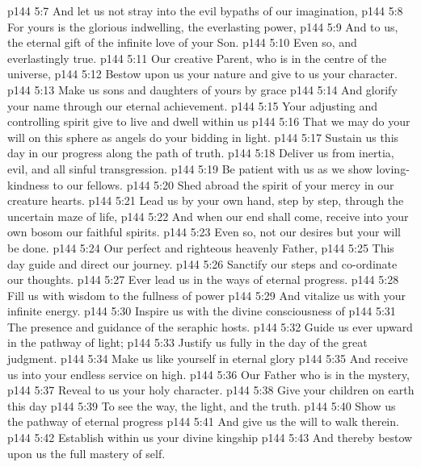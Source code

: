 \vs p144 5:7 \hsetoff And let us not stray into the evil bypaths of our imagination,
\vs p144 5:8 For yours is the glorious indwelling, the everlasting power,
\vs p144 5:9 \hsetoff And to us, the eternal gift of the infinite love of your Son.
\vs p144 5:10 Even so, and everlastingly true.
\separatorshort
\vs p144 5:11 Our creative Parent, who is in the centre of the universe,
\vs p144 5:12 \hsetoff Bestow upon us your nature and give to us your character.
\vs p144 5:13 Make us sons and daughters of yours by grace
\vs p144 5:14 \hsetoff And glorify your name through our eternal achievement.
\vs p144 5:15 Your adjusting and controlling spirit give to live and dwell within us
\vs p144 5:16 \hsetoff That we may do your will on this sphere as angels do your bidding in light.
\vs p144 5:17 Sustain us this day in our progress along the path of truth.
\vs p144 5:18 \hsetoff Deliver us from inertia, evil, and all sinful transgression.
\vs p144 5:19 Be patient with us as we show loving\hyp{}kindness to our fellows.
\vs p144 5:20 \hsetoff Shed abroad the spirit of your mercy in our creature hearts.
\vs p144 5:21 Lead us by your own hand, step by step, through the uncertain maze of life,
\vs p144 5:22 \hsetoff And when our end shall come, receive into your own bosom our faithful spirits.
\vs p144 5:23 Even so, not our desires but your will be done.
\separatorshort
\vs p144 5:24 Our perfect and righteous heavenly Father,
\vs p144 5:25 \hsetoff This day guide and direct our journey.
\vs p144 5:26 Sanctify our steps and co\hyp{}ordinate our thoughts.
\vs p144 5:27 \hsetoff Ever lead us in the ways of eternal progress.
\vs p144 5:28 Fill us with wisdom to the fullness of power
\vs p144 5:29 \hsetoff And vitalize us with your infinite energy.
\vs p144 5:30 Inspire us with the divine consciousness of
\vs p144 5:31 \hsetoff The presence and guidance of the seraphic hosts.
\vs p144 5:32 Guide us ever upward in the pathway of light;
\vs p144 5:33 \hsetoff Justify us fully in the day of the great judgment.
\vs p144 5:34 Make us like yourself in eternal glory
\vs p144 5:35 \hsetoff And receive us into your endless service on high.
\separatorshort
\vs p144 5:36 Our Father who is in the mystery,
\vs p144 5:37 \hsetoff Reveal to us your holy character.
\vs p144 5:38 Give your children on earth this day
\vs p144 5:39 \hsetoff To see the way, the light, and the truth.
\vs p144 5:40 Show us the pathway of eternal progress
\vs p144 5:41 \hsetoff And give us the will to walk therein.
\vs p144 5:42 Establish within us your divine kingship
\vs p144 5:43 \hsetoff And thereby bestow upon us the full mastery of self.
